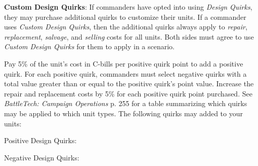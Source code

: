 \item {\bfseries Custom Design Quirks}: If commanders have opted into using \emph{Design Quirks}, they may purchase additional quirks to customize their units.
If a commander uses \emph{Custom Design Quirks}, then the additional quirks always apply to \emph{repair}, \emph{replacement}, \emph{salvage}, and \emph{selling} costs for all units.
Both sides must agree to use \emph{Custom Design Quirks} for them to apply in a scenario.

Pay 5\% of the unit's cost in C-bills per positive quirk point to add a positive quirk.
For each positive quirk, commanders must select negative quirks with a total value greater than or equal to the positive quirk's point value.
Increase the repair and replacement costs by 5\% for each positive quirk point purchased.
See \emph{BattleTech: Campaign Operations} p. 255 for a table summarizing which quirks may be applied to which unit types. The following quirks may added to your units:

Positive Design Quirks:



Negative Design Quirks:


